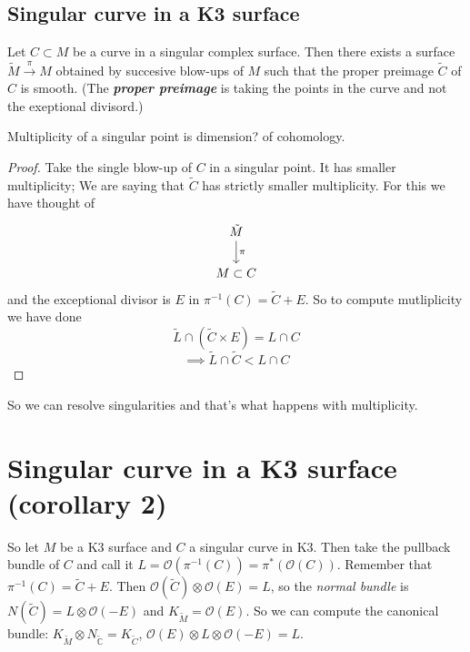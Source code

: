 \subsection{Singular curve in a K3 surface}

\begin{claim}\leavevmode
	Let $C\subset M$ be a curve in a singular complex surface. Then there exists a surface $\tilde{M}\xrightarrow{\pi}M$ obtained by succesive blow-ups of $M$ such that the proper preimage $\tilde{C}$ of $C$ is smooth. (The \textit{\textbf{proper preimage}} is taking the points in the curve and not the exeptional divisord.)
\end{claim}

\begin{defn}\leavevmode
	Multiplicity of a singular point is dimension? of cohomology. \end{defn}

\begin{proof}\leavevmode
	Take the single blow-up of $C$ in a singular point. It has smaller multiplicity; We are saying that $\tilde{C}$ has strictly smaller multiplicity. For this we have thought of
	\[\begin{tikzcd}
	\tilde{M}\arrow[d,"\pi"]\\
	M\subset C
	\end{tikzcd}\]
	and the exceptional divisor is $E$ in $\pi^{-1}(C)=\tilde{C}+E$. So to compute mutliplicity we have done
	\[\tilde{L}\cap(\tilde{C} \times E)=L\cap C\]
	\[\implies \tilde{L}\cap \tilde{C}<L\cap C\]
\end{proof}

\begin{remark}\leavevmode
	So we can resolve singularities and that's what happens with multiplicity.
\end{remark}

\section{Singular curve in a K3 surface (corollary 2)}

So let $M$ be a K3 surface and $C$ a singular curve in K3. Then take the pullback bundle of $C$ and call it $L=\mathcal{O}(\pi^{-1}(C))=\pi^*(\mathcal{O}(C))$. Remember that $\pi^{-1}(C)=\tilde{C}+E$. Then $\mathcal{O}(\tilde{C})\otimes\mathcal{O}(E)=L$, so the \textit{normal bundle} is $N(\tilde{C})=L\otimes \mathcal{O}(-E)$ and $K_{\tilde{M}}=\mathcal{O}(E)$. So we can compute the canonical bundle: $K_{\tilde{M}}\otimes N_{\tilde{\mathbb{C}}}=K_{\tilde{C}}$, $\mathcal{O}(E)\otimes L\otimes \mathcal{O}(-E)=L$.

